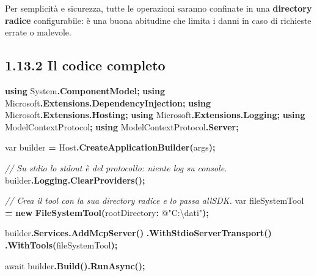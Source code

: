 \documentclass[
  italian,
  10pt,
]{book}
\newenvironment{Shaded}{\begin{snugshade}}{\end{snugshade}}
\newcommand{\CommentTok}[1]{\textcolor[rgb]{0.56,0.35,0.01}{\textit{#1}}}
\newcommand{\DataTypeTok}[1]{\textcolor[rgb]{0.13,0.29,0.53}{#1}}
\newcommand{\FunctionTok}[1]{\textcolor[rgb]{0.13,0.29,0.53}{\textbf{#1}}}
\newcommand{\KeywordTok}[1]{\textcolor[rgb]{0.13,0.29,0.53}{\textbf{#1}}}
\newcommand{\NormalTok}[1]{#1}
\newcommand{\OperatorTok}[1]{\textcolor[rgb]{0.81,0.36,0.00}{\textbf{#1}}}
\newcommand{\StringTok}[1]{\textcolor[rgb]{0.31,0.60,0.02}{#1}}
\begin{document}
Per semplicità e sicurezza, tutte le operazioni saranno confinate in una
\textbf{directory radice} configurabile: è una buona abitudine che
limita i danni in caso di richieste errate o malevole.

\subsection{1.13.2 Il codice completo}\label{il-codice-completo-1}

\begin{Shaded}
\begin{Highlighting}[]
\KeywordTok{using}\NormalTok{ System}\OperatorTok{.}\FunctionTok{ComponentModel}\OperatorTok{;}
\KeywordTok{using}\NormalTok{ Microsoft}\OperatorTok{.}\FunctionTok{Extensions}\OperatorTok{.}\FunctionTok{DependencyInjection}\OperatorTok{;}
\KeywordTok{using}\NormalTok{ Microsoft}\OperatorTok{.}\FunctionTok{Extensions}\OperatorTok{.}\FunctionTok{Hosting}\OperatorTok{;}
\KeywordTok{using}\NormalTok{ Microsoft}\OperatorTok{.}\FunctionTok{Extensions}\OperatorTok{.}\FunctionTok{Logging}\OperatorTok{;}
\KeywordTok{using}\NormalTok{ ModelContextProtocol}\OperatorTok{;}
\KeywordTok{using}\NormalTok{ ModelContextProtocol}\OperatorTok{.}\FunctionTok{Server}\OperatorTok{;}

\DataTypeTok{var}\NormalTok{ builder }\OperatorTok{=}\NormalTok{ Host}\OperatorTok{.}\FunctionTok{CreateApplicationBuilder}\OperatorTok{(}\NormalTok{args}\OperatorTok{);}

\CommentTok{// Su stdio lo stdout è del protocollo: niente log su console.}
\NormalTok{builder}\OperatorTok{.}\FunctionTok{Logging}\OperatorTok{.}\FunctionTok{ClearProviders}\OperatorTok{();}

\CommentTok{// Crea il tool con la sua directory radice e lo passa all\textquotesingle{}SDK.}
\DataTypeTok{var}\NormalTok{ fileSystemTool }\OperatorTok{=} \KeywordTok{new} \FunctionTok{FileSystemTool}\OperatorTok{(}\NormalTok{rootDirectory}\OperatorTok{:}\NormalTok{ @}\StringTok{"C:\textbackslash{}dati"}\OperatorTok{);}

\NormalTok{builder}\OperatorTok{.}\FunctionTok{Services}\OperatorTok{.}\FunctionTok{AddMcpServer}\OperatorTok{()}
    \OperatorTok{.}\FunctionTok{WithStdioServerTransport}\OperatorTok{()}
    \OperatorTok{.}\FunctionTok{WithTools}\OperatorTok{(}\NormalTok{fileSystemTool}\OperatorTok{);}

\NormalTok{await builder}\OperatorTok{.}\FunctionTok{Build}\OperatorTok{().}\FunctionTok{RunAsync}\OperatorTok{();}


\end{Highlighting}
\end{Shaded}
\end{document}
